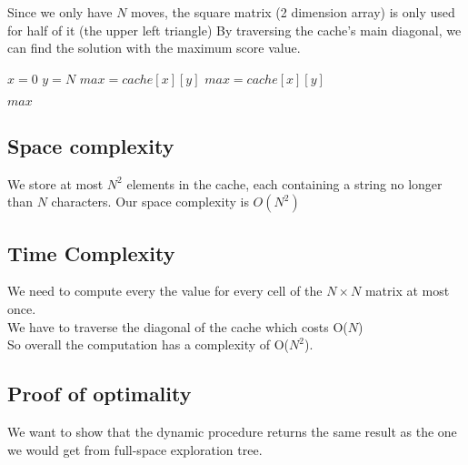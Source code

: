 \documentclass{article}
\begin{document}
Since we only have $N$ moves, the square matrix (2 dimension array) is only used for half of it (the upper left triangle)
By traversing the cache's main diagonal, we can find the solution with the maximum score value.


\begin{algorithm}[H]
\begin{algorithmic}
\caption{}
\State $x = 0$	
\State $y = N$	
\State $max = cache[x][y]$
		\State $max = cache[x][y]$	
	\EndIf
\EndFor

\Return $max$
\EndProcedure
\end{algorithmic}
\end{algorithm}


\subsection{Space complexity}
We store at most $N^2$ elements in the cache, each containing a string no longer than $N$ characters. Our space complexity is $O(N^2)$

\subsection{Time Complexity}

We need to compute every the value for every cell of the $N\times N$ matrix at most once.
\\[0.3cm]
We have to traverse the diagonal of the cache which costs O($N$)
\\[0.3cm]
So overall the computation has a complexity of O($N^{2}$).

\subsection{Proof of optimality}

We want to show that the dynamic procedure returns the same result as the one we would get from full-space exploration tree.
\end{document}
